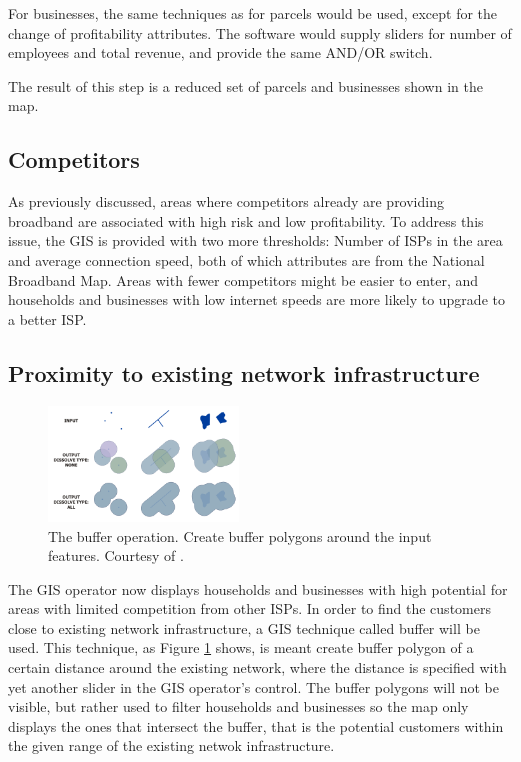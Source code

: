 \documentclass[twocolumn]{article}
\begin{document}
For businesses, the same techniques as for parcels would be used, except for the change of profitability attributes. The software would supply sliders for number of employees and total revenue, and provide the same AND/OR switch.

The result of this step is a reduced set of parcels and businesses shown in the map.
\subsection{Competitors}
\label{sub:Competitors}
As previously discussed, areas where competitors already are providing broadband are associated with high risk and low profitability. To address this issue, the GIS is provided with two more thresholds: Number of ISPs in the area and average connection speed, both of which attributes are from the National Broadband Map. Areas with fewer competitors might be easier to enter, and households and businesses with low internet speeds are more likely to upgrade to a better ISP.

\subsection{Proximity to existing network infrastructure}
\label{sub:Proximity to existing network infrastructure}
\begin{figure}
  \centering
  \includegraphics[width=0.45\textwidth]{img/buffer.png}
  \caption{The buffer operation. Create buffer polygons around the input features. Courtesy of \cite{noauthor_undated-ar}.}
  \label{fig:buffer}
\end{figure}
The GIS operator now displays households and businesses with high potential for areas with limited competition from other ISPs. In order to find the customers close to existing network infrastructure, a GIS technique called buffer will be used. This technique, as Figure \ref{fig:buffer} shows, is meant create buffer polygon of a certain distance around the existing network, where the distance is specified with yet another slider in the GIS operator's control. The buffer polygons will not be visible, but rather used to filter households and businesses so the map only displays the ones that intersect the buffer, that is the potential customers within the given range of the existing netwok infrastructure.
\end{document}
